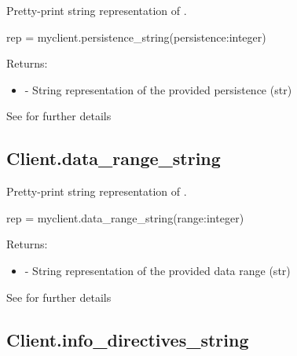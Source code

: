 Pretty-print string representation of .

\format

\pyspecificstart
\begin{codepar}
rep = myclient.persistence_string(persistence:integer)
\end{codepar}
\pyspecificend

\begin{arglist}
\end{arglist}

Returns:
\begin{itemize}
    \item {} - String representation of the provided persistence (str)
\end{itemize}

See  for further details


\subsection{Client.data_range_string}

\summary

Pretty-print string representation of .

\format

\pyspecificstart
\begin{codepar}
rep = myclient.data_range_string(range:integer)
\end{codepar}
\pyspecificend

\begin{arglist}
\end{arglist}

Returns:
\begin{itemize}
    \item {} - String representation of the provided data range (str)
\end{itemize}

See  for further details


\subsection{Client.info_directives_string}

